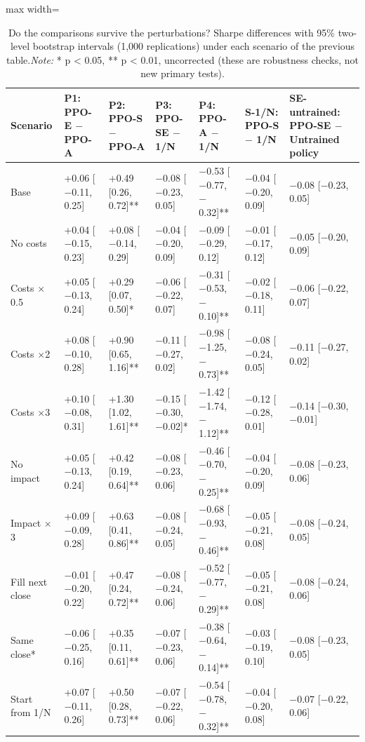 \documentclass[11pt]{article}
\begin{document}
\begin{table}[!htbp]
\centering\scriptsize
\caption{Do the comparisons survive the perturbations? Sharpe differences with 95\% two-level bootstrap intervals (1,000 replications) under each scenario of the previous table.\label{tab-senscomp-no} \emph{Note:} * p \textless{} 0.05, ** p \textless{} 0.01, uncorrected (these are robustness checks, not new primary tests).}
\begin{adjustbox}{max width=\linewidth}
\begin{tabular}{@{}lllllll@{}}
\toprule
Scenario & P1: PPO-E $-$ PPO-A & P2: PPO-S $-$ PPO-A & P3: PPO-SE $-$ 1/N & P4: PPO-A $-$ 1/N & S-1/N: PPO-S $-$ 1/N & SE-untrained: PPO-SE $-$ Untrained policy \\
\midrule
Base & +0.06 {[}$-$0.11, 0.25{]} & +0.49 {[}0.26, 0.72{]}** & $-$0.08 {[}$-$0.23, 0.05{]} & $-$0.53 {[}$-$0.77, $-$0.32{]}** & $-$0.04 {[}$-$0.20, 0.09{]} & $-$0.08 {[}$-$0.23, 0.05{]} \\
No costs & +0.04 {[}$-$0.15, 0.23{]} & +0.08 {[}$-$0.14, 0.29{]} & $-$0.04 {[}$-$0.20, 0.09{]} & $-$0.09 {[}$-$0.29, 0.12{]} & $-$0.01 {[}$-$0.17, 0.12{]} & $-$0.05 {[}$-$0.20, 0.09{]} \\
Costs $\times$0.5 & +0.05 {[}$-$0.13, 0.24{]} & +0.29 {[}0.07, 0.50{]}* & $-$0.06 {[}$-$0.22, 0.07{]} & $-$0.31 {[}$-$0.53, $-$0.10{]}** & $-$0.02 {[}$-$0.18, 0.11{]} & $-$0.06 {[}$-$0.22, 0.07{]} \\
Costs $\times$2 & +0.08 {[}$-$0.10, 0.28{]} & +0.90 {[}0.65, 1.16{]}** & $-$0.11 {[}$-$0.27, 0.02{]} & $-$0.98 {[}$-$1.25, $-$0.73{]}** & $-$0.08 {[}$-$0.24, 0.05{]} & $-$0.11 {[}$-$0.27, 0.02{]} \\
Costs $\times$3 & +0.10 {[}$-$0.08, 0.31{]} & +1.30 {[}1.02, 1.61{]}** & $-$0.15 {[}$-$0.30, $-$0.02{]}* & $-$1.42 {[}$-$1.74, $-$1.12{]}** & $-$0.12 {[}$-$0.28, 0.01{]} & $-$0.14 {[}$-$0.30, $-$0.01{]} \\
No impact & +0.05 {[}$-$0.13, 0.24{]} & +0.42 {[}0.19, 0.64{]}** & $-$0.08 {[}$-$0.23, 0.06{]} & $-$0.46 {[}$-$0.70, $-$0.25{]}** & $-$0.04 {[}$-$0.20, 0.09{]} & $-$0.08 {[}$-$0.23, 0.06{]} \\
Impact $\times$3 & +0.09 {[}$-$0.09, 0.28{]} & +0.63 {[}0.41, 0.86{]}** & $-$0.08 {[}$-$0.24, 0.05{]} & $-$0.68 {[}$-$0.93, $-$0.46{]}** & $-$0.05 {[}$-$0.21, 0.08{]} & $-$0.08 {[}$-$0.24, 0.05{]} \\
Fill next close & $-$0.01 {[}$-$0.20, 0.22{]} & +0.47 {[}0.24, 0.72{]}** & $-$0.08 {[}$-$0.24, 0.06{]} & $-$0.52 {[}$-$0.77, $-$0.29{]}** & $-$0.05 {[}$-$0.21, 0.08{]} & $-$0.08 {[}$-$0.24, 0.06{]} \\
Same close* & $-$0.06 {[}$-$0.25, 0.16{]} & +0.35 {[}0.11, 0.61{]}** & $-$0.07 {[}$-$0.23, 0.06{]} & $-$0.38 {[}$-$0.64, $-$0.14{]}** & $-$0.03 {[}$-$0.19, 0.10{]} & $-$0.08 {[}$-$0.23, 0.05{]} \\
Start from 1/N & +0.07 {[}$-$0.11, 0.26{]} & +0.50 {[}0.28, 0.73{]}** & $-$0.07 {[}$-$0.22, 0.06{]} & $-$0.54 {[}$-$0.78, $-$0.32{]}** & $-$0.04 {[}$-$0.20, 0.08{]} & $-$0.07 {[}$-$0.22, 0.06{]} \\
\bottomrule
\end{tabular}
\end{adjustbox}
\end{table}
\end{document}
